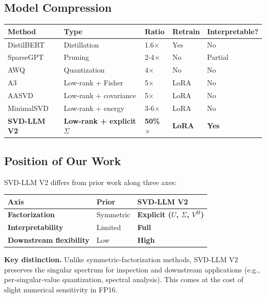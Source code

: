 \subsection{Model Compression}

\begin{table}[H]
\centering
\small
\begin{tabular}{lllll}
\toprule
\textbf{Method} & \textbf{Type} & \textbf{Ratio} & \textbf{Retrain} & \textbf{Interpretable?} \\
\midrule
DistilBERT & Distillation & 1.6$\times$ & Yes & No \\
SparseGPT & Pruning & 2-4$\times$ & No & Partial \\
AWQ & Quantization & 4$\times$ & No & No \\
A3 & Low-rank + Fisher & 5$\times$ & LoRA & No \\
AASVD & Low-rank + covariance & 5$\times$ & LoRA & No \\
MinimalSVD & Low-rank + energy & 3-6$\times$ & LoRA & No \\
\textbf{SVD-LLM V2} & \textbf{Low-rank + explicit $\Sigma$} & \textbf{50\%$\times$} & \textbf{LoRA} & \textbf{Yes} \\
\bottomrule
\end{tabular}
\end{table}

\subsection{Position of Our Work}

SVD-LLM V2 differs from prior work along three axes:

\begin{table}[H]
\centering
\small
\begin{tabular}{lll}
\toprule
\textbf{Axis} & \textbf{Prior} & \textbf{SVD-LLM V2} \\
\midrule
\textbf{Factorization} & Symmetric & \textbf{Explicit ($U$, $\Sigma$, $V^H$)} \\
\textbf{Interpretability} & Limited & \textbf{Full} \\
\textbf{Downstream flexibility} & Low & \textbf{High} \\
\bottomrule
\end{tabular}
\end{table}

\textbf{Key distinction.} Unlike symmetric-factorization methods, SVD-LLM V2 
preserves the singular spectrum for inspection and downstream applications 
(e.g., per-singular-value quantization, spectral analysis). This comes at 
the cost of slight numerical sensitivity in FP16.



